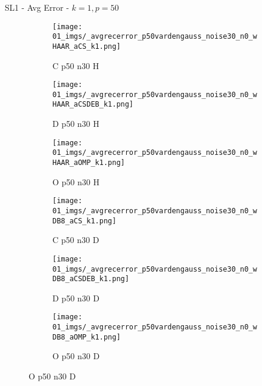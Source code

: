 \begin{frame}{SL1 - Avg Error - $k=1,p=50$}{}
\begin{figure}
\vspace{5pt}

\begin{subfigure}{0.13\textwidth}
\texttt{[image: 01\_imgs/\_avgrecerror\_p50vardengauss\_noise30\_n0\_wHAAR\_aCS\_k1.png]}
\caption*{\tiny C p50 n30 H}
\end{subfigure}
\begin{subfigure}{0.13\textwidth}
\texttt{[image: 01\_imgs/\_avgrecerror\_p50vardengauss\_noise30\_n0\_wHAAR\_aCSDEB\_k1.png]}
\caption*{\tiny D p50 n30 H}
\end{subfigure}
\begin{subfigure}{0.13\textwidth}
\texttt{[image: 01\_imgs/\_avgrecerror\_p50vardengauss\_noise30\_n0\_wHAAR\_aOMP\_k1.png]}
\caption*{\tiny O p50 n30 H}
\end{subfigure}
\begin{subfigure}{0.13\textwidth}
\texttt{[image: 01\_imgs/\_avgrecerror\_p50vardengauss\_noise30\_n0\_wDB8\_aCS\_k1.png]}
\caption*{\tiny C p50 n30 D}
\end{subfigure}
\begin{subfigure}{0.13\textwidth}
\texttt{[image: 01\_imgs/\_avgrecerror\_p50vardengauss\_noise30\_n0\_wDB8\_aCSDEB\_k1.png]}
\caption*{\tiny D p50 n30 D}
\end{subfigure}
\begin{subfigure}{0.13\textwidth}
\texttt{[image: 01\_imgs/\_avgrecerror\_p50vardengauss\_noise30\_n0\_wDB8\_aOMP\_k1.png]}
\caption*{\tiny O p50 n30 D}
\end{subfigure}
\end{figure}
\end{frame}



